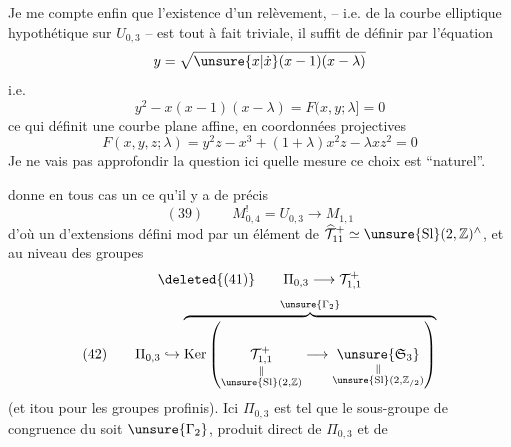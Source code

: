 Je me  compte enfin que l'existence d'un  relèvement, -- i.e. de la courbe elliptique hypothétique sur $U_{0,3}$ -- est tout à fait triviale, il suffit de  définir par l'équation
\[
y=\sqrt{\unsure{x|\dot x}(x-1)(x-\lambda)}
\]
i.e.
\[
y^2-x(x-1)(x-\lambda)=F(x,y;\lambda]=0
\]
ce qui définit une courbe plane affine,
 en coordonnées projectives
\[
F(x,y,z;\lambda)=y^2z-x^3+(1+\lambda)x^2z-\lambda xz^2=0
\]
 Je ne vais pas approfondir la question ici  quelle mesure ce choix est ``naturel''.

  donne en tous cas un   ce qu'il y a de précis
\[
(39)\qquad M_{0,4}^{!}=U_{0,3}\longrightarrow M_{1,1}
\]
d'où un  d'extensions
défini mod   par  un élément de $\widehat{\mathcal T}_{11}^{+}\simeq\unsure{\mathrm{Sl}}(2,\mathbb Z)^{\wedge}$, et au niveau des groupes 
\[
\deleted{(41)}\qquad \Pi_{0,3}\longrightarrow\mathcal T_{1,1}^{+}
\]
\[
(42)\qquad \Pi_{0,3}\hookrightarrow
\overbrace{\operatorname{Ker}\left(
\underset{\substack{\Vert\\\unsure{\mathrm{Sl}}(2,\mathbb Z)}}{\mathcal T_{1,1}^{+}}
\longrightarrow
\underset{\substack{\Vert\\\unsure{\mathrm{Sl}}(2,\mathbb Z_{/2})}}{\unsure{\mathfrak S_3}}
\right)}^{\unsure{\Gamma_2}}
\]
(et itou pour les groupes profinis). Ici $\Pi_{0,3}$ est tel que le sous-groupe de congruence du   \deleted{\unsure{$\Gamma$}} soit $\unsure{\Gamma_2}$,  produit direct de   $\Pi_{0,3}$ et de
